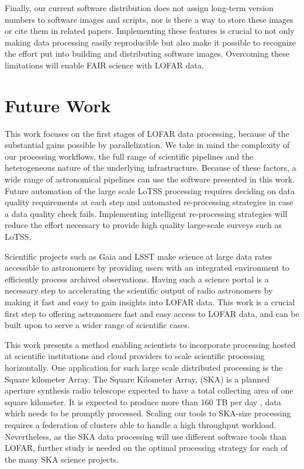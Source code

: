 Finally, our current software distribution does not assign long-term version numbers to software images and scripts, nor is there a way to store these images or cite them in related papers. Implementing these features is crucial to not only making data processing easily reproducible but also make it possible to recognize the effort put into building and distributing software images. Overcoming these limitations will enable FAIR science with LOFAR data\citep{wilkinson2016fair}.


\section{Future Work}

This work focuses on the first stages of LOFAR data processing, because of the substantial gains possible by parallelization. We take in mind the complexity of our processing workflows, the full range of scientific pipelines and the heterogeneous nature of the underlying infrastructure. Because of these factors, a wide range of astronomical pipelines can use the software presented in this work. Future automation of the large scale LoTSS processing requires deciding on data quality requirements at each step and automated re-processing strategies in case a data quality check fails. Implementing intelligent re-processing strategies will reduce the effort necessary to provide high quality large-scale surveys such as LoTSS. 

Scientific projects such as Gaia and LSST make science at large data rates accessible to astronomers by providing users with an integrated environment to efficiently process archived observations. Having such a science portal is a necessary step to accelerating the scientific output of radio astronomers by making it fast and easy to gain insights into LOFAR data. This work is a crucial first step to offering astronomers fast and easy access to LOFAR data, and can be built upon to serve a wider range of scientific cases.

This work presents a method enabling scientists to incorporate processing hosted at scientific institutions and cloud providers to scale scientific processing horizontally. One application for such large scale distributed processing is the Square kilometer Array. The Square Kilometer Array, (SKA) is a planned aperture synthesis radio telescope expected to have a total collecting area of one square kilometer. It is expected to produce more than 160 TB per day \citep{johnston2017taming}, data which needs to be promptly processed. Scaling our tools to SKA-size processing requires a federation of clusters able to handle a high throughput workload. Nevertheless, as the SKA data processing will use different software tools than LOFAR, further study is needed on the optimal processing strategy for each of the many SKA science projects.

